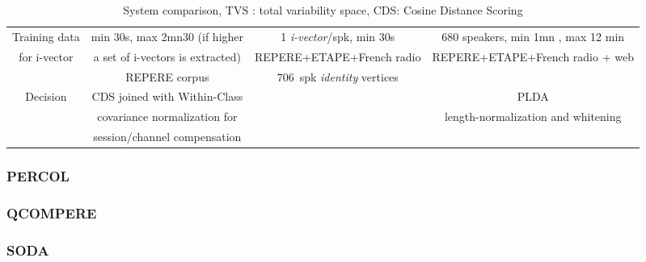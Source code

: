 \begin{table*}[t]
\begin{tabular}{|c|c|c|c|}
    \hline    
    Training data   & min 30s, max 2mn30 (if higher                 & 1 \emph{i-vector}/spk, min 30s                  &  680 speakers, min 1mn , max 12 min         \\
    for i-vector    & a set of i-vectors is extracted)              & REPERE+ETAPE+French radio                       &  REPERE+ETAPE+French radio + web         \\
                    & REPERE corpus                                 & $706$~spk \emph{identity} vertices              &           \\            
    \hline    
    Decision        & CDS joined with Within-Class                  &                                                 &  PLDA         \\
                    & covariance normalization for                  &                                                 &  length-normalization and whitening         \\
                    & session/channel compensation                  &                                                 &           \\
    \hline                              
  \end{tabular}
  \caption{System comparison, TVS : total variability space, CDS: Cosine Distance Scoring}
  \label{tab:system}  
\end{table*}

\subsubsection{PERCOL}


\subsubsection{QCOMPERE}


\subsubsection{SODA}
